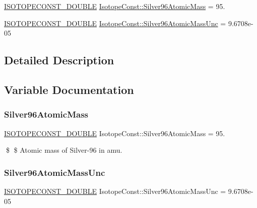 \begin{DoxyCompactItemize}
\item 
\mbox{\hyperlink{group___isotope_const-_macros_ga8f45a7272ce02c0b4c65c44636ed719a}{I\+S\+O\+T\+O\+P\+E\+C\+O\+N\+S\+T\+\_\+\+D\+O\+U\+B\+LE}} \mbox{\hyperlink{group___isotope_const-_silver-_ag96_gaa42a2fa6d1ed40c4424a0ea7497a6dff}{Isotope\+Const\+::\+Silver96\+Atomic\+Mass}} = 95.
\item 
\mbox{\hyperlink{group___isotope_const-_macros_ga8f45a7272ce02c0b4c65c44636ed719a}{I\+S\+O\+T\+O\+P\+E\+C\+O\+N\+S\+T\+\_\+\+D\+O\+U\+B\+LE}} \mbox{\hyperlink{group___isotope_const-_silver-_ag96_ga9b655ce77b966cf2d0e5acd4bf7fea41}{Isotope\+Const\+::\+Silver96\+Atomic\+Mass\+Unc}} = 9.\+6708e-\/05
\end{DoxyCompactItemize}


\subsection{Detailed Description}


\subsection{Variable Documentation}
\mbox{\label{group___isotope_const-_silver-_ag96_gaa42a2fa6d1ed40c4424a0ea7497a6dff}} 
\subsubsection{\texorpdfstring{Silver96\+Atomic\+Mass}{Silver96AtomicMass}}
{\footnotesize\ttfamily \mbox{\hyperlink{group___isotope_const-_macros_ga8f45a7272ce02c0b4c65c44636ed719a}{I\+S\+O\+T\+O\+P\+E\+C\+O\+N\+S\+T\+\_\+\+D\+O\+U\+B\+LE}} Isotope\+Const\+::\+Silver96\+Atomic\+Mass = 95.}

\$ \$ Atomic mass of Silver-\/96 in amu. \mbox{\label{group___isotope_const-_silver-_ag96_ga9b655ce77b966cf2d0e5acd4bf7fea41}} 
\subsubsection{\texorpdfstring{Silver96\+Atomic\+Mass\+Unc}{Silver96AtomicMassUnc}}
{\footnotesize\ttfamily \mbox{\hyperlink{group___isotope_const-_macros_ga8f45a7272ce02c0b4c65c44636ed719a}{I\+S\+O\+T\+O\+P\+E\+C\+O\+N\+S\+T\+\_\+\+D\+O\+U\+B\+LE}} Isotope\+Const\+::\+Silver96\+Atomic\+Mass\+Unc = 9.\+6708e-\/05}

